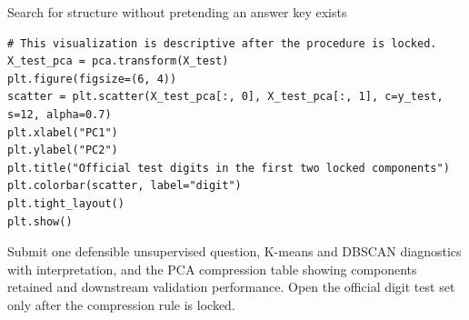 \begin{labproject}{Search for structure without pretending an answer key exists}
\begin{lstlisting}[style=mlpython]
# This visualization is descriptive after the procedure is locked.
X_test_pca = pca.transform(X_test)
plt.figure(figsize=(6, 4))
scatter = plt.scatter(X_test_pca[:, 0], X_test_pca[:, 1], c=y_test, s=12, alpha=0.7)
plt.xlabel("PC1")
plt.ylabel("PC2")
plt.title("Official test digits in the first two locked components")
plt.colorbar(scatter, label="digit")
plt.tight_layout()
plt.show()
\end{lstlisting}

\end{labproject}

\begin{labdeliverable}
Submit one defensible unsupervised question, K-means and DBSCAN diagnostics with interpretation, and the PCA compression table showing components retained and downstream validation performance. Open the official digit test set only after the compression rule is locked.
\end{labdeliverable}
